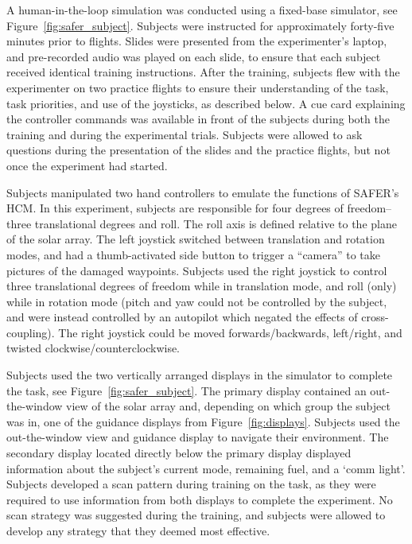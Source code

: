 \documentclass[]{aiaa-tc}%
\begin{document}
A human-in-the-loop simulation was conducted using a fixed-base simulator, see Figure~\ref{fig:safer_subject}. Subjects were instructed for approximately forty-five minutes prior to flights. Slides were presented from the experimenter's laptop, and pre-recorded audio was played on each slide, to ensure that each subject received identical training instructions. After the training, subjects flew with the experimenter on two practice flights to ensure their understanding of the task, task priorities, and use of the joysticks, as described below. A cue card explaining the controller commands was available in front of the subjects during both the training and during the experimental trials. Subjects were allowed to ask questions during the presentation of the slides and the practice flights, but not once the experiment had started.

Subjects manipulated two hand controllers to emulate the functions of SAFER's HCM. In this experiment, subjects are responsible for four degrees of freedom--three translational degrees and roll. The roll axis is defined relative to the plane of the solar array. The left joystick switched between translation and rotation modes, and had a thumb-activated side button to trigger a ``camera'' to take pictures of the damaged waypoints. Subjects used the right joystick to control three translational degrees of freedom while in translation mode, and roll (only) while in rotation mode (pitch and yaw could not be controlled by the subject, and were instead controlled by an autopilot which negated the effects of cross-coupling). The right joystick could be moved forwards/backwards, left/right, and twisted clockwise/counterclockwise.

Subjects used the two vertically arranged displays in the simulator to complete the task, see Figure~\ref{fig:safer_subject}. The primary display contained an out-the-window view of the solar array and, depending on which group the subject was in, one of the guidance displays from Figure~\ref{fig:displays}. Subjects used the out-the-window view and guidance display to navigate their environment. The secondary display located directly below the primary display displayed information about the subject's current mode, remaining fuel, and a `comm light'. Subjects developed a scan pattern during training on the task, as they were required to use information from both displays to complete the experiment. No scan strategy was suggested during the training, and subjects were allowed to develop any strategy that they deemed most effective.
\end{document}
